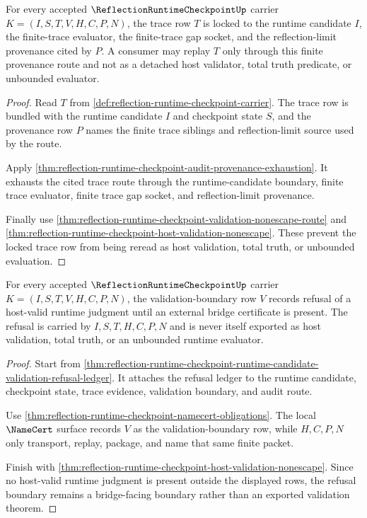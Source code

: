 \begin{theorem}
\label{thm:reflection-runtime-checkpoint-trace-provenance-lock}
For every accepted $\ReflectionRuntimeCheckpointUp$ carrier $K=(I,S,T,V,H,C,P,N)$, the trace row $T$ is locked to the runtime candidate $I$, the finite-trace evaluator, the finite-trace gap socket, and the reflection-limit provenance cited by $P$. A consumer may replay $T$ only through this finite provenance route and not as a detached host validator, total truth predicate, or unbounded evaluator.
\end{theorem}
\begin{proof}
Read $T$ from \autoref{def:reflection-runtime-checkpoint-carrier}. The trace row is bundled with the runtime candidate $I$ and checkpoint state $S$, and the provenance row $P$ names the finite trace siblings and reflection-limit source used by the route.

Apply \autoref{thm:reflection-runtime-checkpoint-audit-provenance-exhaustion}. It exhausts the cited trace route through the runtime-candidate boundary, finite trace evaluator, finite trace gap socket, and reflection-limit provenance.

Finally use \autoref{thm:reflection-runtime-checkpoint-validation-nonescape-route} and \autoref{thm:reflection-runtime-checkpoint-host-validation-nonescape}. These prevent the locked trace row from being reread as host validation, total truth, or unbounded evaluation.
\end{proof}

\begin{theorem}
\label{thm:reflection-runtime-checkpoint-host-validation-refusal-boundary}
For every accepted $\ReflectionRuntimeCheckpointUp$ carrier $K=(I,S,T,V,H,C,P,N)$, the validation-boundary row $V$ records refusal of a host-valid runtime judgment until an external bridge certificate is present. The refusal is carried by $I,S,T,H,C,P,N$ and is never itself exported as host validation, total truth, or an unbounded runtime evaluator.
\end{theorem}
\begin{proof}
Start from \autoref{thm:reflection-runtime-checkpoint-runtime-candidate-validation-refusal-ledger}. It attaches the refusal ledger to the runtime candidate, checkpoint state, trace evidence, validation boundary, and audit route.

Use \autoref{thm:reflection-runtime-checkpoint-namecert-obligations}. The local $\NameCert$ surface records $V$ as the validation-boundary row, while $H,C,P,N$ only transport, replay, package, and name that same finite packet.

Finish with \autoref{thm:reflection-runtime-checkpoint-host-validation-nonescape}. Since no host-valid runtime judgment is present outside the displayed rows, the refusal boundary remains a bridge-facing boundary rather than an exported validation theorem.
\end{proof}

